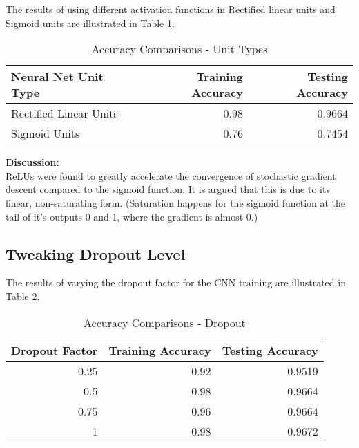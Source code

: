 \documentclass[parskip=half]{scrartcl}
\begin{document}
        The results of using different activation functions in Rectified linear units and Sigmoid units are illustrated in Table \ref{tab:accuracy_comparisons_unit_types}.

        \begin{table}[th]
            \centering
            \begin{tabular}{| l | r | r |}
            \hline
            \textbf{Neural Net Unit Type} & \textbf{Training Accuracy} & \textbf{Testing Accuracy} \\
            \hline
                \hline
                Rectified Linear Units & 0.98 & 0.9664 \\
                \hline
                Sigmoid Units & 0.76 & 0.7454 \\
            \hline
            \end{tabular}
            \caption{Accuracy Comparisons - Unit Types}
            \label{tab:accuracy_comparisons_unit_types}
        \end{table}

        \textbf{Discussion:}\\
        ReLUs were found to greatly accelerate the convergence of stochastic gradient descent compared to the sigmoid function. It is argued that this is due to its linear, non-saturating form. (Saturation happens for the sigmoid function at the tail of it's outputs 0 and 1, where the gradient is almost 0.)
    

    \subsection{Tweaking Dropout Level} %
    \label{sub:tweaking_dropout_level}

        The results of varying the dropout factor for the CNN training are illustrated in Table \ref{tab:accuracy_comparisons_dropout}.

        \begin{table}[th]
            \centering
            \begin{tabular}{| r | r | r |}
            \hline
            \textbf{Dropout Factor} & \textbf{Training Accuracy} & \textbf{Testing Accuracy} \\
            \hline
                \hline
                0.25 & 0.92 & 0.9519 \\
                \hline
                0.5 & 0.98 & 0.9664 \\
                \hline
                0.75 & 0.96 & 0.9664 \\
                \hline
                1 & 0.98 & 0.9672 \\
            \hline
            \end{tabular}
            \caption{Accuracy Comparisons - Dropout}
            \label{tab:accuracy_comparisons_dropout}
        \end{table}
\end{document}
